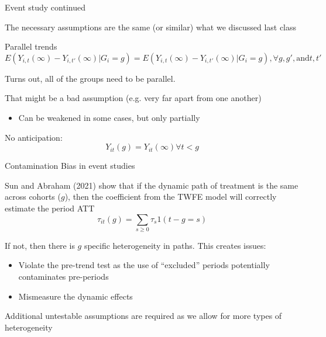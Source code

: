 \documentclass[notes,11pt, aspectratio=169]{beamer}
\newenvironment{wideitemize}{\itemize\addtolength{\itemsep}{10pt}}{\enditemize}
\begin{document}
\begin{frame}{Event study continued}
  \begin{wideitemize}
  \item The necessary assumptions are the same (or similar) what we discussed last class
  \item Parallel trends
      \begin{equation}
        E(Y_{i,t}(\infty) - Y_{i,t'}(\infty) | G_{i} = g) =       E(Y_{i,t}(\infty) - Y_{i,t'}(\infty) | G_{i} = g) , \forall g, g', \text{and} t, t'
    \end{equation}
  \item Turns out, all of the groups need to be parallel.
  \item That might be a bad assumption (e.g. very far apart from
    one another)
    \begin{itemize}
    \item Can be weakened in some cases, but only partially
    \end{itemize}
  \item No anticipation:
    \begin{equation}
      Y_{it}(g) = Y_{it}(\infty) \forall t < g
    \end{equation}
  \end{wideitemize}    
\end{frame}

\begin{frame}{Contamination Bias in event studies}
  \begin{wideitemize}
    \item Sun and Abraham (2021) show that if the dynamic path of
    treatment is the same across cohorts ($g$), then the coefficient
    from the TWFE model will correctly estimate the period ATT
    $$\tau_{it}(g)  = \sum_{s\geq0}\tau_{s}1(t-g = s)$$
  \item If not, then there is $g$ specific heterogeneity in paths. This creates issues:
    \begin{itemize}
    \item Violate the pre-trend test as the use of ``excluded''
      periods potentially contaminates pre-periods
    \item Mismeasure the dynamic effects
    \end{itemize}
    \item Additional untestable assumptions are required as we allow for more types of heterogeneity
  \end{wideitemize}
\end{frame}
\end{document}

